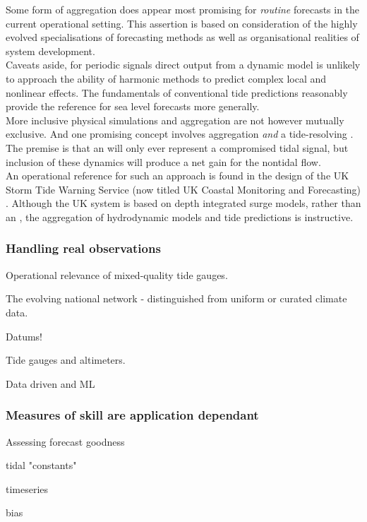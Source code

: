Some form of aggregation does appear most promising for \emph{routine} forecasts in the current operational setting.  
This assertion is based on consideration of the highly evolved specialisations of forecasting methods as well as organisational realities of system development.\\
Caveats aside, for periodic signals direct output from a dynamic model is unlikely to approach the ability of harmonic methods to predict complex local and nonlinear effects.   The fundamentals of conventional tide predictions reasonably provide the reference for sea level forecasts more generally. \\



More inclusive physical simulations and aggregation are not however mutually exclusive.  
And one promising concept involves aggregation \emph{and} a tide-resolving \OGCM{}.  The premise is that an \OGCM{} will only ever represent a compromised tidal signal, but inclusion of these dynamics will produce a net gain for the nontidal flow.\\
An operational reference for such an approach is found in the design of the UK Storm Tide Warning Service (now titled UK Coastal Monitoring and Forecasting) \cite{Horsburg:2009ui}.   Although the UK system is based on depth integrated surge models, rather than an \OGCM{}, the aggregation of hydrodynamic models and tide predictions is instructive.\\   

\subsubsection{Handling real observations}
Operational relevance of mixed-quality tide gauges.

The evolving national network - distinguished from uniform or curated climate data.


Datums!

Tide gauges and altimeters.    


Data driven and ML


\subsubsection{Measures of skill are application dependant}
Assessing forecast goodness

tidal "constants"

timeseries

bias

